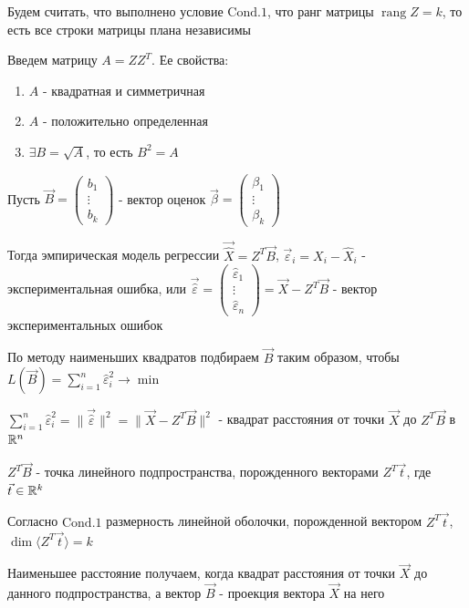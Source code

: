 \documentclass[12pt]{article}
\begin{document}
Будем считать, что выполнено условие $\mathrm{Cond. 1}$, что ранг матрицы $\operatorname{rang} Z = k$, то есть все строки матрицы плана независимы

Введем матрицу $A = Z Z^T$. Ее свойства:

\begin{enumerate}
    \item $A$ - квадратная и симметричная
    \item $A$ - положительно определенная
    \item $\exists B = \sqrt{A}$, то есть $B^2 = A$
\end{enumerate}

Пусть $\vec B = \begin{pmatrix}b_1 \\ \vdots \\ b_k\end{pmatrix}$ - вектор оценок $\vec \beta = \begin{pmatrix}\beta_1 \\ \vdots \\ \beta_k\end{pmatrix}$

Тогда эмпирическая модель регрессии $\vec{\hat X} = Z^T \vec B$, 
$\vec \varepsilon_i = X_i - \hat X_i$ - экспериментальная ошибка, или $\vec {\hat \varepsilon} = \begin{pmatrix}\hat \varepsilon_1 \\ \vdots \\ \hat \varepsilon_n\end{pmatrix} = \vec X - Z^T \vec B$ - вектор экспериментальных ошибок

По методу наименьших квадратов подбираем $\vec B$ таким образом, чтобы $L(\vec B) = \sum_{i = 1}^n \hat \varepsilon_i^2 \longrightarrow \min$

$\sum_{i = 1}^n \hat \varepsilon_i^2 = \|\vec{\hat \varepsilon}\|^2 = \| \vec X - Z^T \vec B\|^2$ - квадрат расстояния от точки $\vec X$ до $Z^T \vec B$ в $\mathbb{R}^n$

$Z^T \vec B$ - точка линейного подпространства, порожденного векторами $Z^T \vec t$, где $\vec t \in \mathbb{R}^k$

\Nota Согласно $\mathrm{Cond. 1}$ размерность линейной оболочки, порожденной вектором $Z^T \vec t$,  $\dim \langle Z^T \vec t \rangle = k$

Наименьшее расстояние получаем, когда квадрат расстояния от точки $\vec X$ до данного подпространства, а вектор $\vec B$ - проекция вектора $\vec X$ на него
\end{document}

